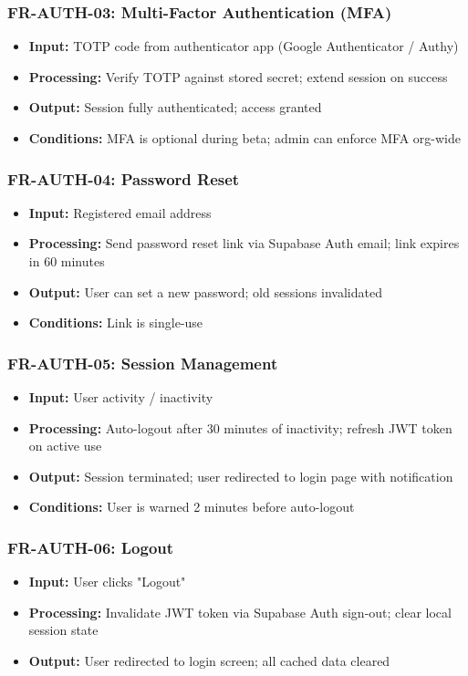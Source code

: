 \documentclass[journal, a4paper, onecolumn, 12pt]{IEEEtran}
\begin{document}
\subsubsection{FR-AUTH-03: Multi-Factor Authentication (MFA)}
\begin{itemize}[leftmargin=*]
\item \textbf{Input:} TOTP code from authenticator app (Google Authenticator / Authy)
\item \textbf{Processing:} Verify TOTP against stored secret; extend session on success
\item \textbf{Output:} Session fully authenticated; access granted
\item \textbf{Conditions:} MFA is optional during beta; admin can enforce MFA org-wide
\end{itemize}

\subsubsection{FR-AUTH-04: Password Reset}
\begin{itemize}[leftmargin=*]
\item \textbf{Input:} Registered email address
\item \textbf{Processing:} Send password reset link via Supabase Auth email; link expires in 60 minutes
\item \textbf{Output:} User can set a new password; old sessions invalidated
\item \textbf{Conditions:} Link is single-use
\end{itemize}

\subsubsection{FR-AUTH-05: Session Management}
\begin{itemize}[leftmargin=*]
\item \textbf{Input:} User activity / inactivity
\item \textbf{Processing:} Auto-logout after 30 minutes of inactivity; refresh JWT token on active use
\item \textbf{Output:} Session terminated; user redirected to login page with notification
\item \textbf{Conditions:} User is warned 2 minutes before auto-logout
\end{itemize}

\subsubsection{FR-AUTH-06: Logout}
\begin{itemize}[leftmargin=*]
\item \textbf{Input:} User clicks "Logout"
\item \textbf{Processing:} Invalidate JWT token via Supabase Auth sign-out; clear local session state
\item \textbf{Output:} User redirected to login screen; all cached data cleared
\end{itemize}
\end{document}
